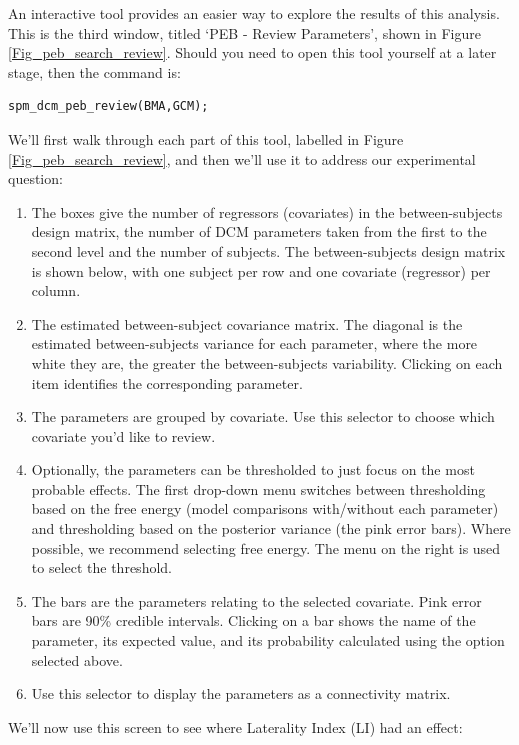 \documentclass{article}
\begin{document}
An interactive tool provides an easier way to explore the results of this analysis. This is the third window, titled `PEB - Review Parameters', shown in Figure \ref{Fig_peb_search_review}. Should you need to open this tool yourself at a later stage, then the command is:

\begin{lstlisting}[style=Matlab-editor,caption=PEB review tool]
spm_dcm_peb_review(BMA,GCM);
\end{lstlisting}

We'll first walk through each part of this tool, labelled in Figure \ref{Fig_peb_search_review}, and then we'll use it to address our experimental question:

\begin{enumerate}[label=\Alph*)]
\item The boxes give the number of regressors (covariates) in the between-subjects design matrix, the number of DCM parameters taken from the first to the second level and the number of subjects. The between-subjects design matrix is shown below, with one subject per row and one covariate (regressor) per column.
\item The estimated between-subject covariance matrix. The diagonal is the estimated between-subjects variance for each parameter, where the more white they are, the greater the between-subjects variability. Clicking on each item identifies the corresponding parameter.
\item The parameters are grouped by covariate. Use this selector to choose which covariate you'd like to review.
\item Optionally, the parameters can be thresholded to just focus on the most probable effects. The first drop-down menu switches between thresholding based on the free energy (model comparisons with/without each parameter) and thresholding based on the posterior variance (the pink error bars). Where possible, we recommend selecting free energy. The menu on the right is used to select the threshold.
\item The bars are the parameters relating to the selected covariate. Pink error bars are 90\% credible intervals. Clicking on a bar shows the name of the parameter, its expected value, and its probability calculated using the option selected above.
\item Use this selector to display the parameters as a connectivity matrix.
\end{enumerate}

We'll now use this screen to see where Laterality Index (LI) had an effect:
\end{document}
